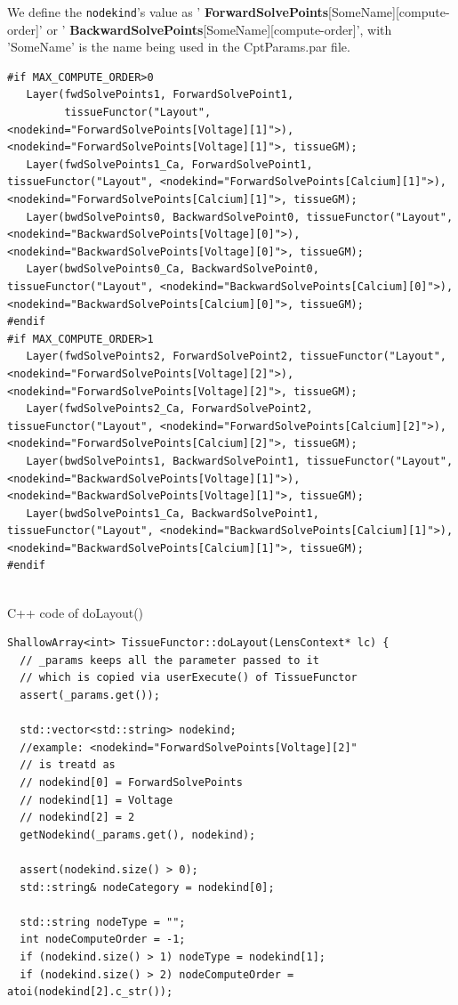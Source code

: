 We define the \verb!nodekind!'s value as '{\bf
ForwardSolvePoints}[SomeName][compute-order]' or '{\bf
BackwardSolvePoints}[SomeName][compute-order]', with 'SomeName' is the name
being used in the CptParams.par file.

{\tiny
\begin{verbatim}
#if MAX_COMPUTE_ORDER>0
   Layer(fwdSolvePoints1, ForwardSolvePoint1, 
         tissueFunctor("Layout", <nodekind="ForwardSolvePoints[Voltage][1]">), <nodekind="ForwardSolvePoints[Voltage][1]">, tissueGM);
   Layer(fwdSolvePoints1_Ca, ForwardSolvePoint1, tissueFunctor("Layout", <nodekind="ForwardSolvePoints[Calcium][1]">), <nodekind="ForwardSolvePoints[Calcium][1]">, tissueGM);
   Layer(bwdSolvePoints0, BackwardSolvePoint0, tissueFunctor("Layout", <nodekind="BackwardSolvePoints[Voltage][0]">), <nodekind="BackwardSolvePoints[Voltage][0]">, tissueGM);
   Layer(bwdSolvePoints0_Ca, BackwardSolvePoint0, tissueFunctor("Layout", <nodekind="BackwardSolvePoints[Calcium][0]">), <nodekind="BackwardSolvePoints[Calcium][0]">, tissueGM);
#endif
#if MAX_COMPUTE_ORDER>1
   Layer(fwdSolvePoints2, ForwardSolvePoint2, tissueFunctor("Layout", <nodekind="ForwardSolvePoints[Voltage][2]">), <nodekind="ForwardSolvePoints[Voltage][2]">, tissueGM);
   Layer(fwdSolvePoints2_Ca, ForwardSolvePoint2, tissueFunctor("Layout", <nodekind="ForwardSolvePoints[Calcium][2]">), <nodekind="ForwardSolvePoints[Calcium][2]">, tissueGM);
   Layer(bwdSolvePoints1, BackwardSolvePoint1, tissueFunctor("Layout", <nodekind="BackwardSolvePoints[Voltage][1]">), <nodekind="BackwardSolvePoints[Voltage][1]">, tissueGM);
   Layer(bwdSolvePoints1_Ca, BackwardSolvePoint1, tissueFunctor("Layout", <nodekind="BackwardSolvePoints[Calcium][1]">), <nodekind="BackwardSolvePoints[Calcium][1]">, tissueGM);
#endif
 
\end{verbatim}
}

C++ code of doLayout()
\begin{lstlisting}
ShallowArray<int> TissueFunctor::doLayout(LensContext* lc) {
  // _params keeps all the parameter passed to it
  // which is copied via userExecute() of TissueFunctor
  assert(_params.get());

  std::vector<std::string> nodekind;
  //example: <nodekind="ForwardSolvePoints[Voltage][2]"
  // is treatd as
  // nodekind[0] = ForwardSolvePoints
  // nodekind[1] = Voltage
  // nodekind[2] = 2
  getNodekind(_params.get(), nodekind);
  
  assert(nodekind.size() > 0);
  std::string& nodeCategory = nodekind[0];
  
  std::string nodeType = "";
  int nodeComputeOrder = -1;
  if (nodekind.size() > 1) nodeType = nodekind[1];
  if (nodekind.size() > 2) nodeComputeOrder = atoi(nodekind[2].c_str());

\end{lstlisting}


